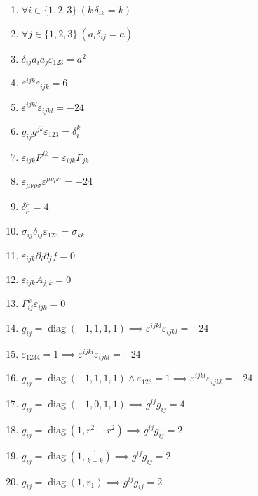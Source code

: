 \documentclass[11pt,a4paper]{article}
\begin{document}
\begin{enumerate}
\item $\displaystyle \forall i \in \{1, 2, 3\}\ \left( k\,\delta_{ik} = k \right)$
\item $\displaystyle \forall j \in \{1, 2, 3\}\ \left( a_{i}\delta_{ij} = a \right)$
\item $\displaystyle \delta_{ij} a_{i} a_{j}\varepsilon_{123} = a^{2}$
\item $\displaystyle \varepsilon^{ijk}\varepsilon_{ijk} = 6$
\item $\displaystyle \varepsilon^{ijkl}\varepsilon_{ijkl} = -24$
\item $\displaystyle g_{ij} g^{jk}\varepsilon_{123} = \delta_{i}^{k}$
\item $\displaystyle \varepsilon_{ijk} F^{jk} = \varepsilon_{ijk} F_{jk}$
\item $\displaystyle \varepsilon_{\mu\nu\rho\sigma}\varepsilon^{\mu\nu\rho\sigma} = -24$
\item $\displaystyle \delta^{\mu}_{\mu} = 4$
\item $\displaystyle \sigma_{ij}\delta_{ij}\varepsilon_{123} = \sigma_{kk}$
\item $\displaystyle \varepsilon_{ijk}\partial_{i}\partial_{j} f = 0$
\item $\displaystyle \varepsilon_{ijk} A_{j,k} = 0$
\item $\displaystyle \Gamma^{k}_{ij}\varepsilon_{ijk} = 0$
\item $\displaystyle g_{ij} = \operatorname{diag}(-1, 1, 1, 1) \implies \varepsilon^{ijkl}\varepsilon_{ijkl} = -24$
\item $\displaystyle \varepsilon_{1234} = 1 \implies \varepsilon^{ijkl}\varepsilon_{ijkl} = -24$
\item $\displaystyle g_{ij} = \operatorname{diag}(-1, 1, 1, 1) \land \varepsilon_{123} = 1 \implies \varepsilon^{ijkl}\varepsilon_{ijkl} = -24$
\item $\displaystyle g_{ij} = \operatorname{diag}(-1, 0, 1, 1) \implies g^{ij} g_{ij} = 4$
\item $\displaystyle g_{ij} = \operatorname{diag}(1, r^{2} - r^{2}) \implies g^{ij} g_{ij} = 2$
\item $\displaystyle g_{ij} = \operatorname{diag}(1, \frac{1}{k - k}) \implies g^{ij} g_{ij} = 2$
\item $\displaystyle g_{ij} = \operatorname{diag}(1, r_{1}) \implies g^{ij} g_{ij} = 2$

\end{enumerate}
\end{document}
